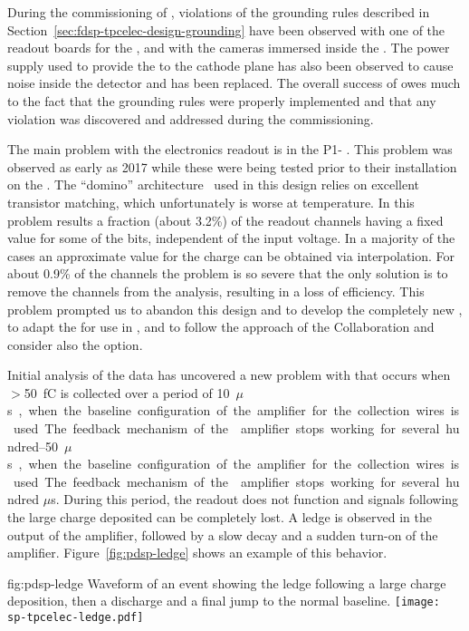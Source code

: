 During the commissioning of , violations of the
grounding rules described in Section~\ref{sec:fdsp-tpcelec-design-grounding}
have been observed with one of the readout
boards for the , and with the cameras immersed
inside the \lar. The power supply used to provide the  to the 
cathode plane has also been observed
to cause noise inside the detector and has been replaced.
The overall success of  owes much to the fact that the
grounding rules were properly implemented
and that any violation was discovered and addressed during
the commissioning.

The main problem with the   electronics readout is in the
P1- . This problem was observed as early as 2017 
while these  were being tested prior to their installation
on the . The ``domino'' architecture~\cite{dominoADC} used in this design relies on
excellent transistor matching, which unfortunately 
is worse at  temperature. In  this problem
results a fraction (about \num{3.2}\%) of the readout channels having a fixed value for some of
the  bits, independent of the input voltage. In a majority
of the cases an approximate value for the charge can be obtained via
interpolation. For about \num{0.9}\% of the channels the problem is
so severe that the only solution is to remove the channels from the
analysis, resulting in a loss of efficiency. This problem prompted us to abandon
this design and to develop the completely new , to
adapt the   for use in , and to
follow the approach of the  Collaboration and consider
also the   option.

Initial analysis of the  data has uncovered a new problem with  
that occurs when $>$\SI{50}{fC} is collected over a period of \SIrange{10}{50}{$\mu$s}, 
when the baseline configuration of the amplifier for the collection wires is used. 
The feedback mechanism of the  amplifier stops working for several 
hundred $\mu$s. During this period, the readout does not function and signals 
following the large charge deposited can be completely lost. A ledge is observed 
in the output of the  amplifier, followed by a slow decay 
and a sudden turn-on of the amplifier.
Figure~\ref{fig:pdsp-ledge} shows an example of this behavior.

\begin{dunefigure}
{fig:pdsp-ledge}
{Waveform of an event showing the ledge following a large charge 
deposition, then a discharge and a final jump to the normal baseline.}
\texttt{[image: sp-tpcelec-ledge.pdf]}
\end{dunefigure}

